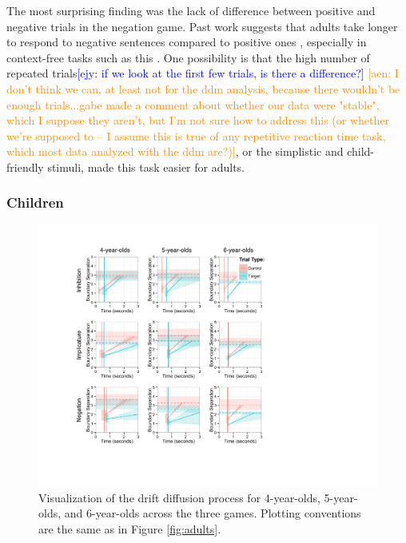 \documentclass[10pt,letterpaper]{article}
\newcommand{\ejy}[1]{\textcolor{Blue}{[ejy: #1]}}
\newcommand{\aen}[1]{\textcolor{DarkOrange}{[aen: #1]}}
\begin{document}
The most surprising finding was the lack of difference between positive and negative trials in the negation game.  Past work suggests that adults take longer to respond to negative sentences compared to positive ones \cite{hclark1972}, especially in context-free tasks such as this \cite{nordmeyer2014a}.  One possibility is that the high number of repeated trials\ejy{if we look at the first few trials, is there a difference?} \aen{I don't think we can, at least not for the ddm analysis, because there wouldn't be enough trials...gabe made a comment about whether our data were "stable", which I suppose they aren't, but I'm not sure how to address this (or whether we're supposed to -- I assume this is true of any repetitive reaction time task, which most data analyzed with the ddm are?)}, or the simplistic and child-friendly stimuli, made this task easier for adults.

\subsubsection{Children}

\begin{figure}
\begin{center} 
\includegraphics[width=6in]{figures/child_vis.pdf}
\caption{\label{fig:kids} Visualization of the drift diffusion process for 4-year-olds, 5-year-olds, and 6-year-olds across the three games.  Plotting conventions are the same as in Figure \ref{fig:adults}.}
\end{center} 
\end{figure}
\end{document}
